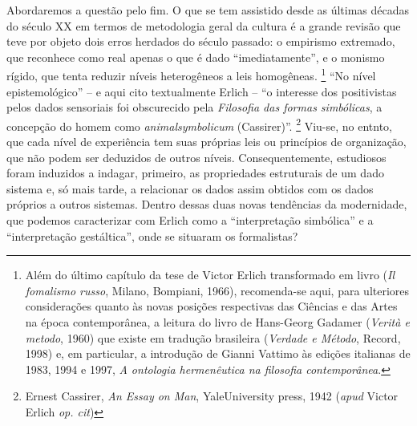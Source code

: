 Abordaremos a questão pelo fim. O que se tem assistido desde as últimas
décadas do século XX em termos de metodologia geral da cultura é a
grande revisão que teve por objeto dois erros herdados do século
passado: o empirismo extremado, que reconhece como real apenas o que é
dado ``imediatamente'', e o monismo rígido, que tenta reduzir níveis
heterogêneos a leis homogêneas. \footnote{Além do último capítulo da
  tese de Victor Erlich transformado em livro (\emph{Il fomalismo
  russo}, Milano, Bompiani, 1966), recomenda-se aqui, para ulteriores
  considerações quanto às novas posições respectivas das Ciências e das
  Artes na época contemporânea, a leitura do livro de Hans-Georg Gadamer
  (\emph{Verità e metodo}, 1960) que existe em tradução brasileira
  (\emph{Verdade e Método}, Record, 1998) e, em particular, a introdução
  de Gianni Vattimo às edições italianas de 1983, 1994 e 1997, \emph{A
  ontologia hermenêutica na filosofia contemporânea}.} ``No nível
epistemológico'' -- e aqui cito textualmente Erlich -- ``o interesse dos
positivistas pelos dados sensoriais foi obscurecido pela \emph{Filosofia
das formas simbólicas}, a concepção do homem como
\emph{animalsymbolicum} (Cassirer)''. \footnote{Ernest Cassirer,
  \emph{An Essay on Man}, YaleUniversity press, 1942 (\emph{apud} Victor
  Erlich \emph{op. cit})} Viu-se, no entnto, que cada nível de
experiência tem suas próprias leis ou princípios de organização, que não
podem ser deduzidos de outros níveis. Consequentemente, estudiosos foram
induzidos a indagar, primeiro, as propriedades estruturais de um dado
sistema e, só mais tarde, a relacionar os dados assim obtidos com os
dados próprios a outros sistemas. Dentro dessas duas novas tendências da
modernidade, que podemos caracterizar com Erlich como a ``interpretação
simbólica'' e a ``interpretação gestáltica'', onde se situaram os
formalistas?


